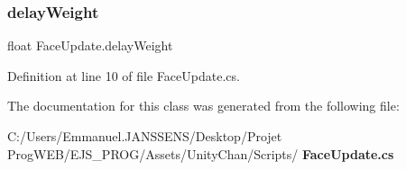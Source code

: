 \subsubsection{delay\+Weight}
{\footnotesize\ttfamily float Face\+Update.\+delay\+Weight}



Definition at line 10 of file Face\+Update.\+cs.



The documentation for this class was generated from the following file\+:\begin{DoxyCompactItemize}
\item 
C\+:/\+Users/\+Emmanuel.\+J\+A\+N\+S\+S\+E\+N\+S/\+Desktop/\+Projet Prog\+W\+E\+B/\+E\+J\+S\+\_\+\+P\+R\+O\+G/\+Assets/\+Unity\+Chan/\+Scripts/\textbf{ Face\+Update.\+cs}\end{DoxyCompactItemize}
